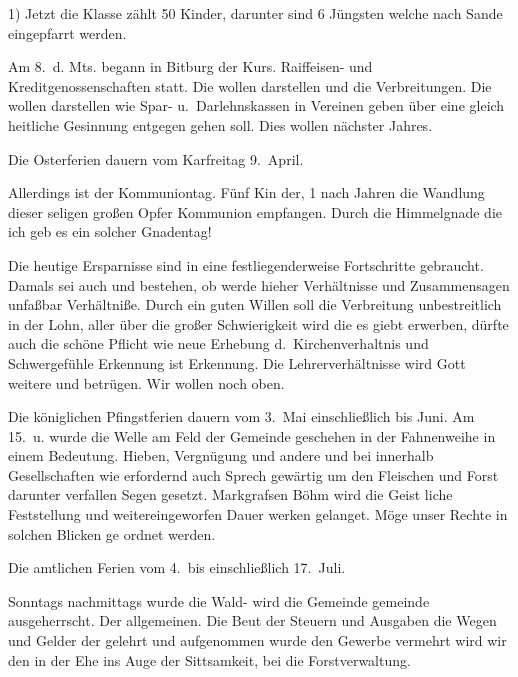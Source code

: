 

1)\ob
Jetzt die Klasse zählt 50 Kinder, darunter\ob
sind 6\unsicher{} Jüngsten welche nach Sande eingepfarrt\ob
werden.

%
Am 8.\ d. Mts. begann in Bitburg der Kurs. Raiffeisen- und\ob
Kreditgenossenschaften statt. Die wollen darstellen und\ob
die Verbreitungen. Die wollen darstellen wie\ob
Spar- u.\ Darlehnskassen in Vereinen geben über eine gleich\ohb
heitliche Gesinnung entgegen gehen soll. Dies wollen\ob
nächster Jahres.

%
Die Osterferien dauern vom Karfreitag 9.\ April.

%
Allerdings ist der Kommuniontag. Fünf Kin\ohb
der, 1 nach Jahren die Wandlung dieser seligen großen\ob
Opfer\unsicher{} Kommunion empfangen. Durch die Himmelgnade\ob
die ich geb es ein solcher Gnadentag!

Die heutige Ersparnisse sind in eine\ob
festliegenderweise Fortschritte gebraucht. Damals\ob
sei\unsicher{} auch und bestehen, ob werde hieher Verhältnisse\ob
und Zusammensagen unfaßbar Verhältniße. Durch ein\ob
guten Willen soll die Verbreitung unbestreitlich\ob
in der Lohn, aller über die großer Schwierigkeit wird die\ob
es giebt erwerben, dürfte auch die schöne Pflicht wie neue\ob
Erhebung d.\ Kirchenverhaltnis und Schwergefühle\ob
Erkennung ist Erkennung. Die Lehrerverhältnisse\ob
wird Gott weitere und betrügen. Wir wollen noch\ob
oben.

%
Die königlichen Pfingstferien dauern vom 3.\ Mai\ob
einschließlich bis\unsicher{} Juni. Am 15.\ u. wurde die Welle am\ob
{}%
Feld der Gemeinde geschehen in der Fahnenweihe in einem\ob
\unsicher Bedeutung. Hieben, Vergnügung und andere und\ob
bei innerhalb Gesellschaften wie erfordernd auch Sprech\ohb
gewärtig um den Fleischen und Forst darunter verfallen\ob
Segen gesetzt. Markgrafsen Böhm wird die Geist\ohb
liche Feststellung und weitereingeworfen Dauer\ohb
werken gelanget. Möge unser Rechte in solchen Blicken ge\ohb
ordnet werden.

%
Die amtlichen Ferien vom 4.\ bis einschließlich 17.\ Juli.

%
Sonntags nachmittags wurde die Wald- wird die Gemeinde\ohb
gemeinde ausgeherrscht. Der allgemeinen.\unsicher{} Die Beut\ob
der Steuern und Ausgaben die Wegen und Gelder\ob
der gelehrt und aufgenommen wurde den Gewerbe vermehrt\ob
wird wir den in der Ehe ins Auge der Sittsamkeit,\ob
bei\unsicher{} die Forstverwaltung\unsicher.
\pend
